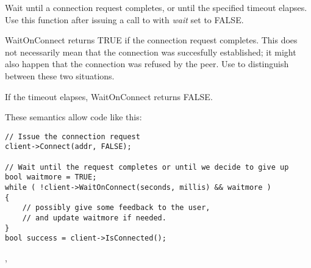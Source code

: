 %
%
\label{wxsocketclientwaitonconnect}


Wait until a connection request completes, or until the specified timeout
elapses. Use this function after issuing a call to 
with {\it wait} set to FALSE.





WaitOnConnect returns TRUE if the connection request completes. This
does not necessarily mean that the connection was succesfully established;
it might also happen that the connection was refused by the peer. Use
 to distinguish between
these two situations.

If the timeout elapses, WaitOnConnect returns FALSE.

These semantics allow code like this:

\begin{verbatim}
// Issue the connection request
client->Connect(addr, FALSE);

// Wait until the request completes or until we decide to give up
bool waitmore = TRUE; 
while ( !client->WaitOnConnect(seconds, millis) && waitmore )
{
    // possibly give some feedback to the user,
    // and update waitmore if needed.
}
bool success = client->IsConnected();
\end{verbatim}


,

\section{}\label{wxsocketevent}

